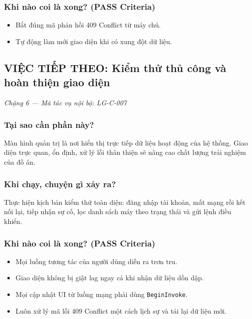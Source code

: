 \documentclass[12pt,a4paper]{article}
\begin{document}
\subsubsection{Khi nào coi là xong? (PASS Criteria)}
\begin{itemize}
  \item Bắt đúng mã phản hồi 409 Conflict từ máy chủ.
  \item Tự động làm mới giao diện khi có xung đột dữ liệu.
\end{itemize}

\subsection{VIỆC TIẾP THEO: Kiểm thử thủ công và hoàn thiện giao diện}
{\footnotesize\color{lgGray}\textit{Chặng 6 — Mã tác vụ nội bộ: LG-C-007}}\par
\vspace{2mm}

\subsubsection{Tại sao cần phần này?}
Màn hình quản trị là nơi hiển thị trực tiếp dữ liệu hoạt động của hệ thống. Giao diện trực quan, ổn định, xử lý lỗi thân thiện sẽ nâng cao chất lượng trải nghiệm của đồ án.

\subsubsection{Khi chạy, chuyện gì xảy ra?}
Thực hiện kịch bản kiểm thử toàn diện: đăng nhập tài khoản, mất mạng rồi kết nối lại, tiếp nhận sự cố, lọc danh sách máy theo trạng thái và gửi lệnh điều khiển.

\subsubsection{Khi nào coi là xong? (PASS Criteria)}
\begin{itemize}
  \item Mọi luồng tương tác của người dùng diễn ra trơn tru.
  \item Giao diện không bị giật lag ngay cả khi nhận dữ liệu dồn dập.
\end{itemize}

\begin{takeawaybox}
\begin{itemize}[leftmargin=1.5em, itemsep=1pt]
  \item Mọi cập nhật UI từ luồng mạng phải dùng \texttt{BeginInvoke}.
  \item Luôn xử lý mã lỗi 409 Conflict một cách lịch sự và tải lại dữ liệu mới.
\end{itemize}
\end{takeawaybox}
\end{document}
